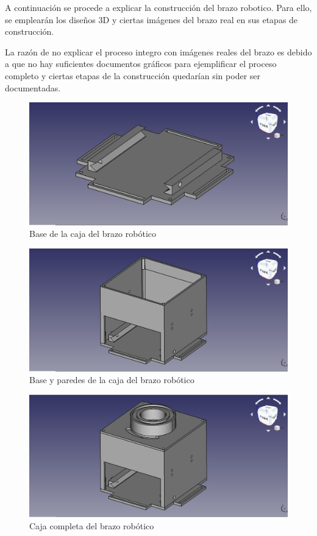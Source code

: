 A continuación se procede a explicar la construcción del brazo robotico. Para ello, se emplearán los diseños 3D y ciertas imágenes del brazo real en sus etapas de construcción.

La razón de no explicar el proceso integro con imágenes reales del brazo es debido a que no hay suficientes documentos gráficos para ejemplificar el proceso completo y ciertas etapas de la construcción quedarían sin poder ser documentadas.

\begin{figure}[H]
    \centering 
    \includegraphics[width=1\linewidth]{pictures/BaseDelBrazoRobotico.png}
    \caption{Base de la caja del brazo robótico}
    \label{fig:base_caja_brazo_robotico}
\end{figure}

\begin{figure}[H]
    \centering 
    \includegraphics[width=1\linewidth]{pictures/BaseYParedes.png}
    \caption{Base y paredes de la caja del brazo robótico}
    \label{fig:base_paredes_caja_brazo_robotico}
\end{figure}

\begin{figure}[H]
    \centering 
    \includegraphics[width=1\linewidth]{pictures/CajaCompleta.png}
    \caption{Caja completa del brazo robótico}
    \label{fig:caja_completa_brazo_robotico}
\end{figure}

